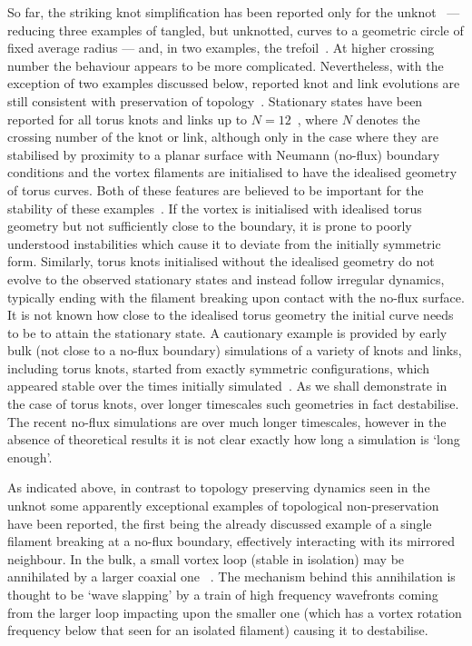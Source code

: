 So far, the striking knot simplification has been reported only for the unknot~\citep{Maucher2016} --- reducing three examples of tangled, but unknotted, curves to a geometric circle of fixed average radius --- and, in two examples, the trefoil~\citep{Sutcliffe2003,Maucher2016}. At higher crossing number the behaviour appears to be more complicated. Nevertheless, with the exception of two examples discussed below, reported knot and link evolutions are still consistent with preservation of topology~\citep{Henze1993, Winfree1990, WinfreeChapter, Sutcliffe2003,Maucher2016,Maucher2017, Maucher2019}. Stationary states have been reported for all torus knots and links up to $N=12$~\citep{Maucher2017,Maucher2019}, where $N$ denotes the crossing number of the knot or link, although only in the case where they are stabilised by proximity to a planar surface with Neumann (no-flux) boundary conditions and the vortex filaments are initialised to have the idealised geometry of torus curves. Both of these features are believed to be important for the stability of these examples~\citep{Maucher2017,Maucher2019}. If the vortex is initialised with idealised torus geometry but not sufficiently close to the boundary, it is prone to poorly understood instabilities which cause it to deviate from the initially symmetric form. Similarly, torus knots initialised without the idealised geometry do not evolve to the observed stationary states and instead follow irregular dynamics, typically ending with the filament breaking upon contact with the no-flux surface. It is not known how close to the idealised torus geometry the initial curve needs to be to attain the stationary state. A cautionary example is provided by early bulk (not close to a no-flux boundary) simulations of a variety of knots and links, including torus knots, started from exactly symmetric configurations, which appeared stable over the times initially simulated~\citep{Henze1993}. As we shall demonstrate in the case of torus knots, over longer timescales such geometries in fact destabilise. The recent no-flux simulations are over much longer timescales, however in the absence of theoretical results it is not clear exactly how long a simulation is `long enough'.

As indicated above, in contrast to topology preserving dynamics seen in the unknot some apparently exceptional examples of topological non-preservation have been reported, the first being the already discussed example of a single filament breaking at a no-flux boundary, effectively interacting with its mirrored neighbour. In the bulk, a small vortex loop (stable in isolation) may be annihilated by a larger coaxial one ~\citep{Courtemanche1990,Maucher2018}. The mechanism behind this annihilation is thought to be `wave slapping' by a train of high frequency wavefronts coming from the larger loop impacting upon the smaller one (which has a vortex rotation frequency below that seen for an isolated filament) causing it to destabilise. 

